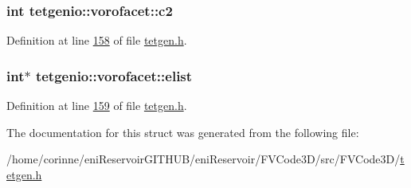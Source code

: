 \subsubsection[{\texorpdfstring{c2}{c2}}]{\setlength{\rightskip}{0pt plus 5cm}int tetgenio\+::vorofacet\+::c2}\hypertarget{structtetgenio_1_1vorofacet_a368f7dcb47dc65f5655570e942f1e414}{}\label{structtetgenio_1_1vorofacet_a368f7dcb47dc65f5655570e942f1e414}


Definition at line \hyperlink{tetgen_8h_source_l00158}{158} of file \hyperlink{tetgen_8h_source}{tetgen.\+h}.

\subsubsection[{\texorpdfstring{elist}{elist}}]{\setlength{\rightskip}{0pt plus 5cm}int$\ast$ tetgenio\+::vorofacet\+::elist}\hypertarget{structtetgenio_1_1vorofacet_a7dc623ea5f4a6006fcc20b2bc8a1f560}{}\label{structtetgenio_1_1vorofacet_a7dc623ea5f4a6006fcc20b2bc8a1f560}


Definition at line \hyperlink{tetgen_8h_source_l00159}{159} of file \hyperlink{tetgen_8h_source}{tetgen.\+h}.



The documentation for this struct was generated from the following file\+:\begin{DoxyCompactItemize}
\item 
/home/corinne/eni\+Reservoir\+G\+I\+T\+H\+U\+B/eni\+Reservoir/\+F\+V\+Code3\+D/src/\+F\+V\+Code3\+D/\hyperlink{tetgen_8h}{tetgen.\+h}\end{DoxyCompactItemize}
